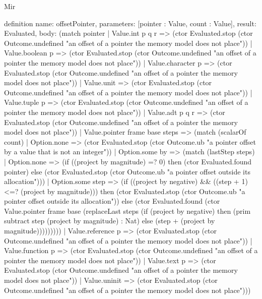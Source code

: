 \begin{lexlean}{Mir}
\begin{semanticmodule}
definition{
  name: offsetPointer,
  parameters: [pointer : Value, count : Value],
  result: Evaluated,
  body: (match pointer
    | Value.int p q r => (ctor Evaluated.stop (ctor Outcome.undefined "an offset of a pointer the memory model does not place"))
    | Value.boolean p => (ctor Evaluated.stop (ctor Outcome.undefined "an offset of a pointer the memory model does not place"))
    | Value.character p => (ctor Evaluated.stop (ctor Outcome.undefined "an offset of a pointer the memory model does not place"))
    | Value.unit => (ctor Evaluated.stop (ctor Outcome.undefined "an offset of a pointer the memory model does not place"))
    | Value.tuple p => (ctor Evaluated.stop (ctor Outcome.undefined "an offset of a pointer the memory model does not place"))
    | Value.adt p q r => (ctor Evaluated.stop (ctor Outcome.undefined "an offset of a pointer the memory model does not place"))
    | Value.pointer frame base steps => (match (scalarOf count)
      | Option.none => (ctor Evaluated.stop (ctor Outcome.ub "a pointer offset by a value that is not an integer"))
      | Option.some by => (match (lastStep steps)
        | Option.none => (if ((project by magnitude) =? 0) then (ctor Evaluated.found pointer) else (ctor Evaluated.stop (ctor Outcome.ub "a pointer offset outside its allocation")))
        | Option.some step => (if ((project by negative) && ((step + 1) <=? (project by magnitude))) then (ctor Evaluated.stop (ctor Outcome.ub "a pointer offset outside its allocation")) else (ctor Evaluated.found (ctor Value.pointer frame base (replaceLast steps (if (project by negative) then (prim subtract step (project by magnitude) : Nat) else (step + (project by magnitude)))))))))
    | Value.reference p => (ctor Evaluated.stop (ctor Outcome.undefined "an offset of a pointer the memory model does not place"))
    | Value.function p => (ctor Evaluated.stop (ctor Outcome.undefined "an offset of a pointer the memory model does not place"))
    | Value.text p => (ctor Evaluated.stop (ctor Outcome.undefined "an offset of a pointer the memory model does not place"))
    | Value.uninit => (ctor Evaluated.stop (ctor Outcome.undefined "an offset of a pointer the memory model does not place")))
}


\end{semanticmodule}
\end{lexlean}
